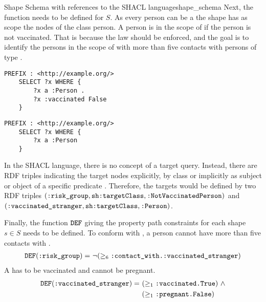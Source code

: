 \begin{Bsp}{Shape Schema with references to the SHACL language}{shape_schema}
Next, the  function needs to be defined for $S$. As every person can be a  the shape has as scope the nodes of the class person. A person is in the scope of  if the person is not vaccinated. That is because the law should be enforced, and the goal is to identify the persons in the scope of  with more than five contacts with persons of type .
\begin{center}
  \begin{minipage}[t]{0.45\textwidth}
    \lstset{language=html}
    \begin{lstlisting}[captionpos=b, caption=\uri{TARG}(\uri{:risk\_group}), basicstyle=\ttfamily, frame=single]
    PREFIX : <http://example.org/>
    SELECT ?x WHERE {
        ?x a :Person .
        ?x :vaccinated False
    }
    \end{lstlisting}\end{minipage}
\hspace{0.1cm}
\begin{minipage}[t]{0.45\textwidth}
    \lstset{language=html}
    \begin{lstlisting}[captionpos=b, caption=\uri{TARG}(\uri{:vaccinated\_stranger}) , basicstyle=\ttfamily, frame=single]
    PREFIX : <http://example.org/>
    SELECT ?x WHERE {
        ?x a :Person
    }
    \end{lstlisting}\end{minipage}  
\end{center}
In the SHACL language, there is no concept of a target query. Instead, there are RDF triples indicating the target nodes explicitly, by class or implicitly as subject or object of a specific predicate \cite{knublauch2017shapes}. Therefore, the targets would be defined by two RDF triples $(\texttt{:risk\_group}, \texttt{sh:targetClass}, \texttt{:NotVaccinatedPerson})$ and $(\texttt{:vaccinated\_stranger}, \texttt{sh:targetClass}, \texttt{:Person})$.

Finally, the function $\texttt{DEF}$ giving the property path constraints for each shape $s \in S$ needs to be defined. To conform with , a person cannot have more than five contacts with .
\begin{align*}
    \texttt{DEF}(\texttt{:risk\_group}) = ~ & \neg (\geq_6 \texttt{:contact\_with.:vaccinated\_stranger})\\
\end{align*}
A  has to be vaccinated and cannot be pregnant.
\begin{align*}
    \texttt{DEF}(\texttt{:vaccinated\_stranger}) = ~ & (\geq_1 \texttt{:vaccinated.True})~ \land\\
                                             & (\geq_1 \texttt{:pregnant.False})
\end{align*}


\end{Bsp}
